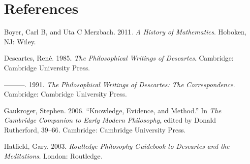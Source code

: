 \documentclass[12pt]{article}
\begin{document}
\section*{References}
\label{sec:org47bfa37}
\begin{hangparas}{1.5em}{1}
\hypertarget{citeproc_bib_item_1}{Boyer, Carl B, and Uta C Merzbach. 2011. \textit{A History of Mathematics}. Hoboken, NJ: Wiley.}

\hypertarget{citeproc_bib_item_2}{Descartes, René. 1985. \textit{The Philosophical Writings of Descartes}. Cambridge: Cambridge University Press.}

\hypertarget{citeproc_bib_item_3}{———. 1991. \textit{The Philosophical Writings of Descartes: The Correspondence}. Cambridge: Cambridge University Press.}

\hypertarget{citeproc_bib_item_4}{Gaukroger, Stephen. 2006. “Knowledge, Evidence, and Method.” In \textit{The Cambridge Companion to Early Modern Philosophy}, edited by Donald Rutherford, 39–66. Cambridge: Cambridge University Press.}

\hypertarget{citeproc_bib_item_5}{Hatfield, Gary. 2003. \textit{Routledge Philosophy Guidebook to Descartes and the Meditations}. London: Routledge.}
\end{hangparas}
\end{document}
